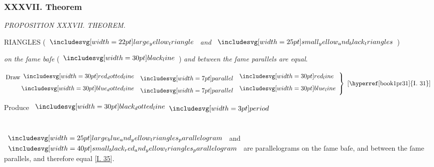 \documentclass[11pt,preview]{standalone}
\begin{document}
\subsubsection{XXXVII. Theorem}

\begin{minipage}[t]{0.43\textwidth}
    \vspace{24pt}
    
\end{minipage}%
\hfill
\begin{minipage}[t]{0.55\textwidth}
    \begin{center}
        \textit{PROPOSITION XXXVII. THEOREM.}\label{book1pr37} \\
    \end{center}

    \hfill

    \begin{center}
        \raggedright \lettrine[lines=3, loversize=1, nindent=0pt]{}{}RIANGLES (\hspace{-1ex}$\img[0][0][22]{large_yellow_triangle}$ \textit{and} $\img{small_yellow_and_black_triangles}$\hspace{-1ex})
    \end{center}
    \textit{on the ſame baſe} (\hspace{-1ex}$\blackline$\hspace{-1ex}) \textit{and between the ſame parallels are equal}.
\end{minipage}

\hfill

{\vspace{1ex}\begin{center}
        $\left.\begin{aligned}\text{Draw}\dottedredline & \bparallel \redline \\ \dottedblueline & \bparallel \blueline \end{aligned}\right\}\text{ [\hyperref[book1pr31]{\textsc{I.} 31}]}$
    \end{center}}

\begin{center}
    Produce $\dottedblackline \bperiod$\\
    \hfill\\
    \hfill\\
    $\img{large_blue_and_yellow_triangles_parallelogram}$ and $\img[0][0][40]{small_black_red_and_yellow_triangles_parallelogram}$ are parallelograms on the ſame baſe, and between the ſame parallels, and therefore equal [\hyperref[book1pr35]{\textsc{I.} 35}].
\end{center}
\end{document}
